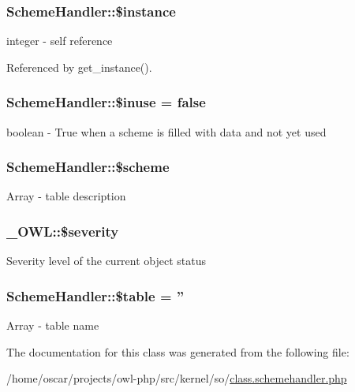 \subsubsection[{\$instance}]{\setlength{\rightskip}{0pt plus 5cm}SchemeHandler::\$instance}\label{classSchemeHandler_a6f45c52527230b3f3b60d75a9b55e3c1}
integer -\/ self reference 

Referenced by get\_\-instance().

\subsubsection[{\$inuse}]{\setlength{\rightskip}{0pt plus 5cm}SchemeHandler::\$inuse = false}\label{classSchemeHandler_a90e5b04603f86c04b1691b2ddf730104}
boolean -\/ True when a scheme is filled with data and not yet used 
\subsubsection[{\$scheme}]{\setlength{\rightskip}{0pt plus 5cm}SchemeHandler::\$scheme}\label{classSchemeHandler_aeb6dfa54ebd11b0d6acc51b8244d598c}
Array -\/ table description 
\subsubsection[{\$severity}]{\setlength{\rightskip}{0pt plus 5cm}\_\-OWL::\$severity}\label{class__OWL_ad26b40a9dbbacb33e299b17826f8327c}
Severity level of the current object status 
\subsubsection[{\$table}]{\setlength{\rightskip}{0pt plus 5cm}SchemeHandler::\$table = ''}\label{classSchemeHandler_aea92c0f74dbb2e1efd07bdb472660e20}
Array -\/ table name 

The documentation for this class was generated from the following file:\begin{DoxyCompactItemize}
\item 
/home/oscar/projects/owl-\/php/src/kernel/so/\hyperlink{class_8schemehandler_8php}{class.schemehandler.php}\end{DoxyCompactItemize}
